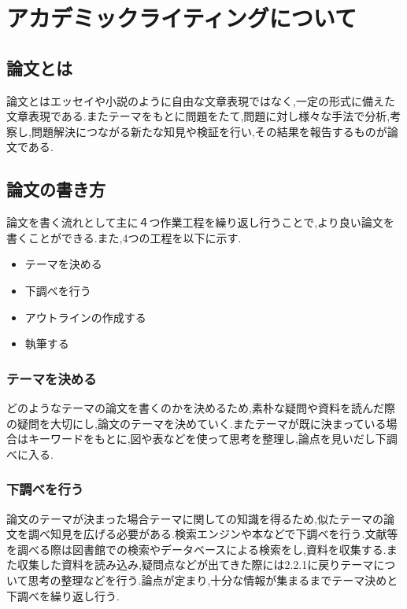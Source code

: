 \documentclass[a4j,12pt]{jarticle}
\begin{document}
\section{アカデミックライティングについて}
\subsection{論文とは}
論文とはエッセイや小説のように自由な文章表現ではなく,一定の形式に備えた文章表現である.またテーマをもとに問題をたて,問題に対し様々な手法で分析,考察し,問題解決につながる新たな知見や検証を行い,その結果を報告するものが論文である\cite{ren1}.

\subsection{論文の書き方}
論文を書く流れとして主に４つ作業工程を繰り返し行うことで,より良い論文を書くことができる.また,4つの工程を以下に示す.
\begin{itemize}
  \item テーマを決める
  \item 下調べを行う
  \item アウトラインの作成する
  \item 執筆する
\end{itemize}
\subsubsection{テーマを決める}
どのようなテーマの論文を書くのかを決めるため,素朴な疑問や資料を読んだ際の疑問を大切にし,論文のテーマを決めていく.またテーマが既に決まっている場合はキーワードをもとに,図や表などを使って思考を整理し,論点を見いだし下調べに入る.

\subsubsection{下調べを行う}
論文のテーマが決まった場合テーマに関しての知識を得るため,似たテーマの論文を調べ知見を広げる必要がある.検索エンジンや本などで下調べを行う.文献等を調べる際は図書館での検索やデータベースによる検索をし,資料を収集する.また収集した資料を読み込み,疑問点などが出てきた際には2.2.1に戻りテーマについて思考の整理などを行う.論点が定まり,十分な情報が集まるまでテーマ決めと下調べを繰り返し行う.
\end{document}
